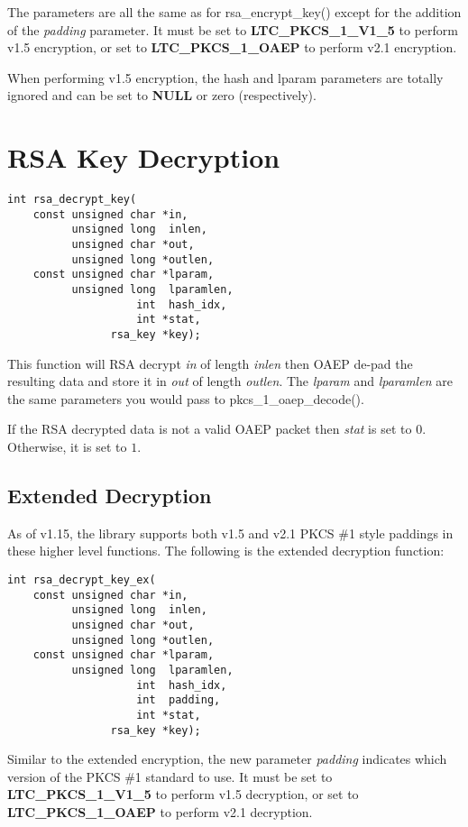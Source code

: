 \documentclass[synpaper]{book}
\newcommand{\mysection}[1]    %
	{                   %
	\section{#1}
   \markboth{\textsf{www.libtom.org}}{\thesection ~ {#1}}
	}
\begin{document}
 
The parameters are all the same as for rsa\_encrypt\_key() except for the addition of the \textit{padding} parameter.  It must be set to
\textbf{LTC\_PKCS\_1\_V1\_5} to perform v1.5 encryption, or set to \textbf{LTC\_PKCS\_1\_OAEP} to perform v2.1 encryption.

When performing v1.5 encryption, the hash and lparam parameters are totally ignored and can be set to \textbf{NULL} or zero (respectively).

\mysection{RSA Key Decryption}
\begin{verbatim}
int rsa_decrypt_key(
    const unsigned char *in,
          unsigned long  inlen,
          unsigned char *out,
          unsigned long *outlen,
    const unsigned char *lparam,
          unsigned long  lparamlen,
                    int  hash_idx,
                    int *stat,
                rsa_key *key);
\end{verbatim}
This function will RSA decrypt \textit{in} of length \textit{inlen} then OAEP de-pad the resulting data and store it in
\textit{out} of length \textit{outlen}.  The \textit{lparam} and \textit{lparamlen} are the same parameters you would pass
to pkcs\_1\_oaep\_decode().

If the RSA decrypted data is not a valid OAEP packet then \textit{stat} is set to $0$.  Otherwise, it is set to $1$.

\subsection{Extended Decryption}
As of v1.15, the library supports both v1.5 and v2.1 PKCS \#1 style paddings in these higher level functions.  The following is the extended
decryption function:

\begin{verbatim}
int rsa_decrypt_key_ex(
    const unsigned char *in,
          unsigned long  inlen,
          unsigned char *out,
          unsigned long *outlen,
    const unsigned char *lparam,
          unsigned long  lparamlen,
                    int  hash_idx,
                    int  padding,
                    int *stat,
                rsa_key *key);
\end{verbatim}

Similar to the extended encryption, the new parameter \textit{padding} indicates which version of the PKCS \#1 standard to use.
It must be set to \textbf{LTC\_PKCS\_1\_V1\_5} to perform v1.5 decryption, or set to \textbf{LTC\_PKCS\_1\_OAEP} to perform v2.1 decryption.
\end{document}
